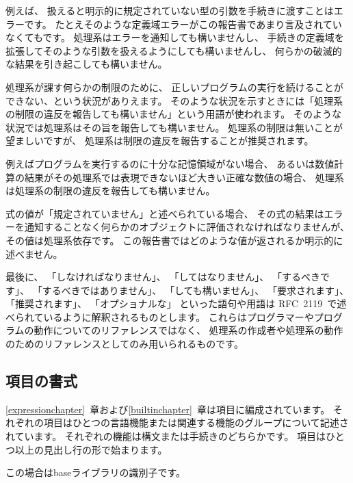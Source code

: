 例えば、
扱えると明示的に規定されていない型の引数を手続きに渡すことはエラーです。
たとえそのような定義域エラーがこの報告書であまり言及されていなくてもです。
処理系はエラーを通知しても構いませんし、
手続きの定義域を拡張してそのような引数を扱えるようにしても構いませんし、
何らかの破滅的な結果を引き起こしても構いません。

\vest 処理系が課す何らかの制限のために、
正しいプログラムの実行を続けることができない、という状況がありえます。
そのような状況を示すときには「処理系の制限の違反を報告しても構いません」という用語が使われます。
そのような状況では処理系はその旨を報告しても構いません。
処理系の制限は無いことが望ましいですが、
処理系は制限の違反を報告することが推奨されます。

\vest 例えばプログラムを実行するのに十分な記憶領域がない場合、
あるいは数値計算の結果がその処理系では表現できないほど大きい正確な数値の場合、
処理系は処理系の制限の違反を報告しても構いません。

\vest 式の値が「規定されていません」と述べられている場合、
その式の結果はエラーを通知することなく何らかのオブジェクトに評価されなければなりませんが、
その値は処理系依存です。
この報告書ではどのような値が返されるか明示的に述べません。

\vest 最後に、
「しなければなりません」、
「してはなりません」、
「するべきです」、
「するべきではありません」、
「しても構いません」、
「要求されます」、
「推奨されます」、
「オプショナルな」
といった語句や用語は
RFC~2119~\cite{rfc2119}で述べられているように解釈されるものとします。
これらはプログラマーやプログラムの動作についてのリファレンスではなく、
処理系の作成者や処理系の動作のためのリファレンスとしてのみ用いられるものです。



\subsection{項目の書式}

\ref{expressionchapter}~章および\ref{builtinchapter}~章は項目に編成されています。
それぞれの項目はひとつの言語機能または関連する機能のグループについて記述されています。
それぞれの機能は構文または手続きのどちらかです。
項目はひとつ以上の見出し行の形で始まります。

\noindent{}\unpenalty

この場合はbaseライブラリの識別子です。

\noindent{}\unpenalty

